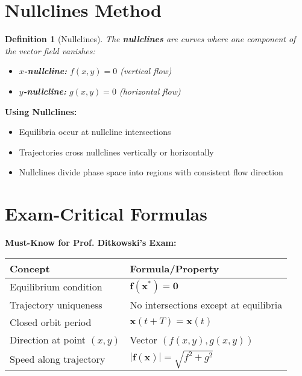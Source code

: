 \documentclass[12pt]{article}
\newtheorem{definition}{Definition}
\begin{document}
\section{Nullclines Method}

\begin{definition}[Nullclines]
The \textbf{nullclines} are curves where one component of the vector field vanishes:
\begin{itemize}
    \item \textbf{$x$-nullcline:} $f(x,y) = 0$ (vertical flow)
    \item \textbf{$y$-nullcline:} $g(x,y) = 0$ (horizontal flow)
\end{itemize}
\end{definition}

\begin{insight}
\textbf{Using Nullclines:}
\begin{itemize}
    \item Equilibria occur at nullcline intersections
    \item Trajectories cross nullclines vertically or horizontally
    \item Nullclines divide phase space into regions with consistent flow direction
\end{itemize}
\end{insight}

\section{Exam-Critical Formulas}

\begin{examtip}
\textbf{Must-Know for Prof. Ditkowski's Exam:}

\begin{tabular}{|l|l|}
\hline
\textbf{Concept} & \textbf{Formula/Property} \\
\hline
Equilibrium condition & $\mathbf{f}(\mathbf{x}^*) = \mathbf{0}$ \\
\hline
Trajectory uniqueness & No intersections except at equilibria \\
\hline
Closed orbit period & $\mathbf{x}(t+T) = \mathbf{x}(t)$ \\
\hline
Direction at point $(x,y)$ & Vector $(f(x,y), g(x,y))$ \\
\hline
Speed along trajectory & $|\mathbf{f}(\mathbf{x})| = \sqrt{f^2 + g^2}$ \\
\hline
\end{tabular}
\end{examtip}
\end{document}

